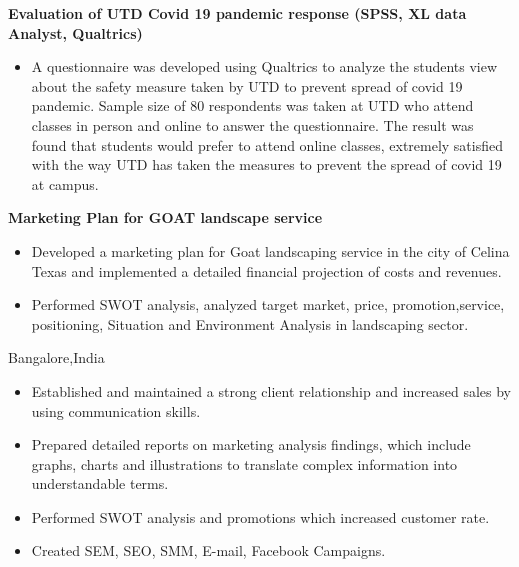 \documentclass[10pt,a4paper]{altacv}
\begin{document}
 \textbf{{Evaluation of UTD Covid 19 pandemic response (SPSS, XL data Analyst, Qualtrics)}}
\begin{itemize}
\item  A questionnaire was developed using Qualtrics to analyze the students view about the safety measure taken by UTD to prevent spread of covid 19 pandemic. Sample size of 80 respondents was taken at UTD who attend classes in person and online to answer the questionnaire. The result was found that students would prefer to attend online classes, extremely satisfied with the way UTD has taken the measures to prevent the spread of covid 19 at campus.
\end{itemize}
\divider

\textbf{{Marketing Plan for GOAT landscape service}} 
\begin{itemize}
\item Developed a marketing plan for Goat landscaping service in the city of Celina Texas and implemented a detailed financial projection of costs and revenues.
\item Performed SWOT analysis, analyzed target market, price, promotion,service, positioning, Situation and Environment Analysis in landscaping sector.
\end{itemize}

 {Bangalore,India}
 
\begin{itemize}
\item Established and maintained a strong client relationship and increased sales by using communication skills.
\item  Prepared detailed reports on marketing analysis findings, which include graphs, charts and illustrations to translate complex information into understandable terms.
\item Performed SWOT analysis and promotions which increased customer rate.
\item Created SEM, SEO, SMM, E-mail, Facebook Campaigns.
\end{itemize}
\end{document}
